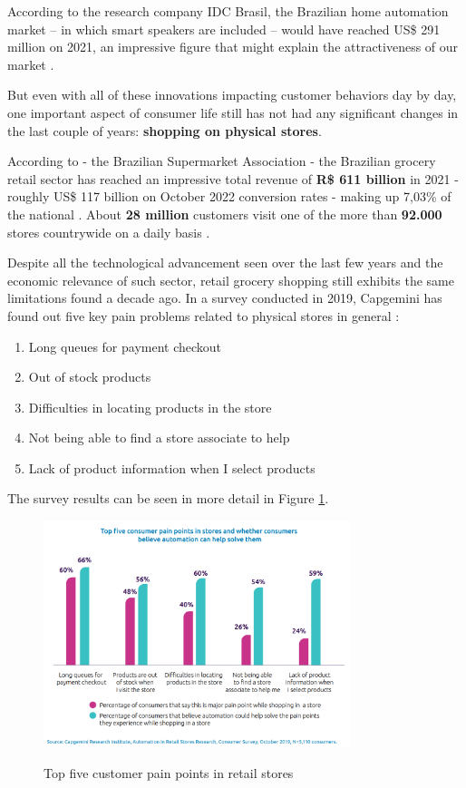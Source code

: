 According to the research company IDC Brasil, the Brazilian home automation
market -- in which smart speakers are included -- would have reached US\$ 291
million on 2021, an impressive figure that might explain the attractiveness of
our market \cite{IDCBrasil}.

But even with all of these innovations impacting customer behaviors day by day, one
important aspect of consumer life still has not had any significant changes in
the last couple of years: \textbf{shopping on
physical stores}.

According to  - the
Brazilian Supermarket Association - the Brazilian grocery retail sector has reached an
impressive total revenue of \textbf{R\$ 611 billion} in 2021 - roughly US\$ 117 billion on
October 2022 conversion rates - making up 7,03\% of the national . About \textbf{28 million} customers visit one of the more than
\textbf{92.000} stores countrywide on a daily basis \cite{Abras2022}.

Despite all the technological advancement seen over the last few years and the
economic relevance of such sector, retail grocery shopping still exhibits the
same limitations found a decade ago. In a survey conducted in 2019, Capgemini
has found out five key pain problems related to physical stores in general
\cite{Capgemini2020}:

\begin{enumerate}
        \item Long queues for payment checkout
        \item Out of stock products
        \item Difficulties in locating products in the store
        \item Not being able to find a store associate to help
        \item Lack of product information when I select products
\end{enumerate}

The survey results can be seen in more detail in Figure \ref{fig:capgemini}.

\begin{figure}[H]
	\centering
    \caption[Top five customer pain points in retail stores]{Top five customer pain points in retail stores}
	\includegraphics[width=0.8\textwidth]{./images/painpoints.png}
    \label{fig:capgemini}
\end{figure}


